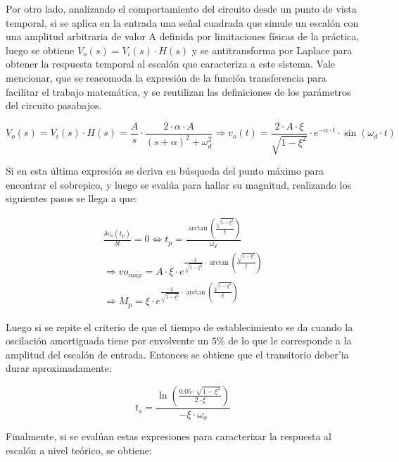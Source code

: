 Por otro lado, analizando el comportamiento del circuito desde un punto de vista temporal, si se aplica en la entrada una se\~nal cuadrada que simule un escal\'on
con una amplitud arbitraria de valor A definida por limitaciones f\'isicas de la pr\'actica, luego se obtiene $V_o(s) = V_i(s) \cdot H(s)$ y se antitransforma por Laplace
para obtener la respuesta temporal al escal\'on que caracteriza a este sistema. Vale mencionar, que se reacomoda la expresi\'on de la funci\'on transferencia para facilitar el trabajo
matem\'atica, y se reutilizan las definiciones de los par\'ametros del circuito pasabajos.

\begin{equation*}
    V_o(s) = V_i(s) \cdot H(s) = \frac{A}{s} \cdot \frac{2 \cdot \alpha \cdot A}{(s + \alpha)^{2} + \omega_d^{2}}
    \Rightarrow v_o(t) = \frac{2 \cdot A \cdot \xi}{\sqrt{1 - \xi^{2}}} \cdot e^{- \alpha \cdot t} \cdot \sin{(\omega_d \cdot t)}
\end{equation*}

Si en esta \'ultima expresi\'on se deriva en b\'usqueda del punto m\'aximo para encontrar el sobrepico, y luego se eval\'ua para hallar su magnitud,
realizando los siguientes pasos se llega a que:

\begin{align*}
    \frac{\delta v_o(t_p)}{\delta t} = 0 \Leftrightarrow t_p = \frac{\arctan{(\frac{\sqrt{1 - \xi^{2}}}{\xi})}}{\omega_d} \\
    \Rightarrow
    vo_{max} = A \cdot \xi \cdot e^{\frac{- \xi}{\sqrt{1 - \xi^{2}}} \cdot \arctan{(\frac{\sqrt{1 - \xi^{2}}}{\xi})}} \\
    \Rightarrow 
    M_p = \xi \cdot e^{\frac{- \xi}{\sqrt{1 - \xi^{2}}} \cdot \arctan{(\frac{\sqrt{1 - \xi^{2}}}{\xi})}}
\end{align*}

Luego si se repite el criterio de que el tiempo de establecimiento se da cuando la oscilaci\'on amortiguada tiene por envolvente
un $5 \%$ de lo que le corresponde a la amplitud del escal\'on de entrada. Entonces se obtiene que el transitorio deber'ia durar aproximadamente:

\begin{equation}
    t_s = \frac{ \ln{(\frac{0.05 \cdot \sqrt{1 - \xi^{2}}}{2 \cdot \xi})} }{- \xi \cdot \omega_o}
\end{equation}

Finalmente, si se eval\'uan estas expresiones para caracterizar la respuesta al escal\'on a nivel te\'orico, se obtiene:

